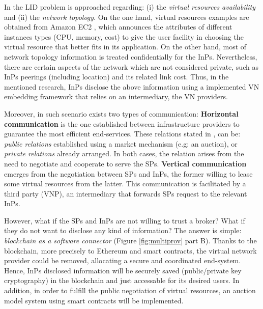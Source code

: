 In \cite{dietrich2015multi} the LID problem is approached regarding: (i) the \textit{virtual resources availability} and (ii) the \textit{network topology}. On the one hand, virtual resources examples are obtained from Amazon EC2 \cite{amazonEC2}, which announces the attributes of different instances types (CPU, memory, cost) to give the user facility in choosing the virtual resource that better fits in its application. On the other hand, most of network topology information is treated confidentially for the InPs. Nevertheless, there are certain aspects of the network which are not considered private, such as InPs peerings (including location) and its related link cost. Thus, in the mentioned research, InPs disclose the above information using a implemented VN embedding framework that relies on an intermediary, the VN providers.

Moreover, in such scenario exists two types of communication: \newline
\textbf{Horizontal communication} is the one established between infrastructure providers to guarantee the most efficient end-services. These relations stated in \citep{zaheer2010multi}, can be: \textit{public relations} established using a market mechanism (e.g: an auction), or \textit{private relations} already arranged. In both cases, the relation arises from the need to negotiate and cooperate to serve the SPs. \newline
\textbf{Vertical communication} emerges from the negotiation between SPs and InPs, the former willing to lease some virtual resources from the latter. This communication is facilitated by a third party (VNP), an intermediary that forwards SPs request to the relevant InPs.

However, what if the SPs and InPs are not willing to trust a broker? What if they do not want to disclose any kind of information? The answer is simple: \textit{blockchain as a software connector} (Figure \ref{fig:multiprov} part B). Thanks to the blockchain, more precisely to Ethereum and smart contracts, the virtual network provider could be removed, allocating a secure and coordinated end-system. Hence, InPs disclosed information will be securely saved (public/private key cryptography) in the blockchain and just accessable for its desired users. In addition, in order to fulfill the public negotiation of virtual resources, an auction model system using smart contracts will be implemented.

